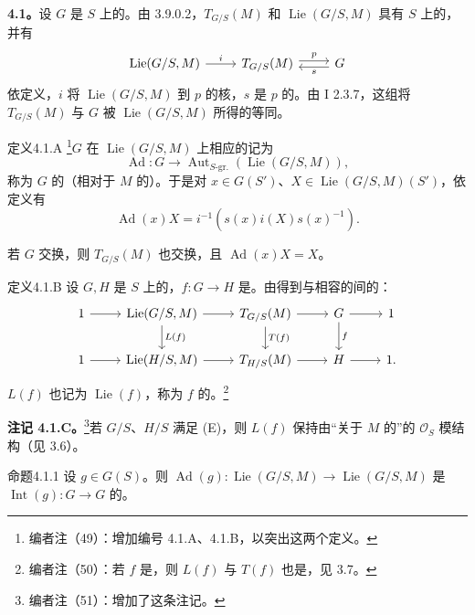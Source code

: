 \textbf{4.1。}设 $G$ 是 $S$ 上的。由 3.9.0.2，$T_{G/S}(M)$ 和 $\operatorname{Lie}(G/S,M)$ 具有 $S$ 上的，并有
\[
\begin{tikzcd}
\operatorname{Lie}(G/S,M)\arrow[r,"i"]&T_{G/S}(M)\arrow[r,shift left,"p"]&G\arrow[l,shift left,"s"]
\end{tikzcd}
\]
依定义，$i$ 将 $\operatorname{Lie}(G/S,M)$ 到 $p$ 的核，$s$ 是 $p$ 的。由 I 2.3.7，这组将 $T_{G/S}(M)$ 与 $G$ 被 $\operatorname{Lie}(G/S,M)$ 所得的等同。
\begin{SGAresult}{定义}{4.1.A}
\footnote{编者注（49）：增加编号 4.1.A、4.1.B，以突出这两个定义。}$G$ 在 $\operatorname{Lie}(G/S,M)$ 上相应的记为
\[\operatorname{Ad}:G\longrightarrow\operatorname{Aut}_{S\text{-gr.}}(\operatorname{Lie}(G/S,M)),\]
称为 $G$ 的（相对于 $M$ 的）。于是对 $x\in G(S')$、$X\in\operatorname{Lie}(G/S,M)(S')$，依定义有
\[\operatorname{Ad}(x)X=i^{-1}(s(x)i(X)s(x)^{-1}).\]
\end{SGAresult}
若 $G$ 交换，则 $T_{G/S}(M)$ 也交换，且 $\operatorname{Ad}(x)X=X$。
\begin{SGAresult}{定义}{4.1.B}
设 $G,H$ 是 $S$ 上的，$f:G\to H$ 是。由得到与相容的间的：
\[
\begin{tikzcd}
1\arrow[r]&\operatorname{Lie}(G/S,M)\arrow[r]\arrow[d,"L(f)"]&T_{G/S}(M)\arrow[r]\arrow[d,"T(f)"]&G\arrow[r]\arrow[d,"f"]&1\\
1\arrow[r]&\operatorname{Lie}(H/S,M)\arrow[r]&T_{H/S}(M)\arrow[r]&H\arrow[r]&1.
\end{tikzcd}
\]
$L(f)$ 也记为 $\operatorname{Lie}(f)$，称为 $f$ 的。\footnote{编者注（50）：若 $f$ 是，则 $L(f)$ 与 $T(f)$ 也是，见 3.7。}
\end{SGAresult}
\textbf{注记 4.1.C。}\footnote{编者注（51）：增加了这条注记。}若 $G/S$、$H/S$ 满足 (E)，则 $L(f)$ 保持由“关于 $M$ 的”的 $\mathcal O_S$ 模结构（见 3.6）。
\begin{SGAresult}{命题}{4.1.1}
设 $g\in G(S)$。则 $\operatorname{Ad}(g):\operatorname{Lie}(G/S,M)\to\operatorname{Lie}(G/S,M)$ 是 $\operatorname{Int}(g):G\to G$ 的。
\end{SGAresult}
